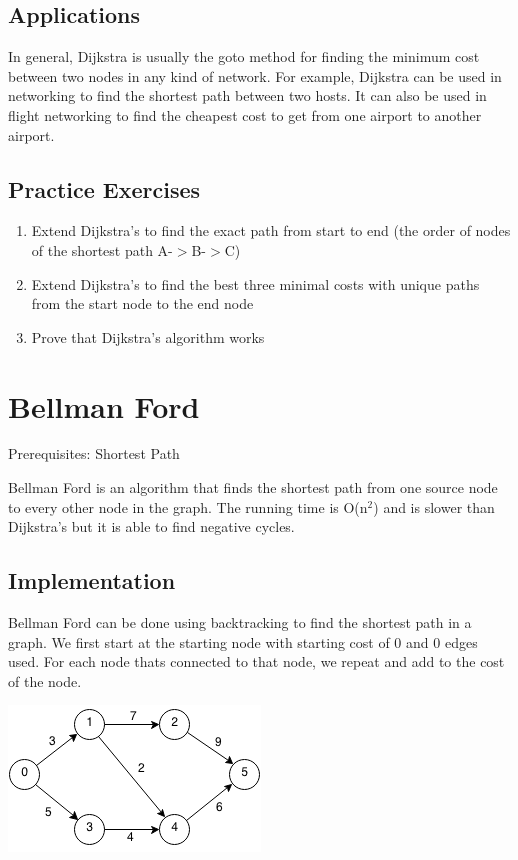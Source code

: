 \documentclass[11pt,oneside]{book}
\makeatletter
\def\maxwidth#1{\ifdim\Gin@nat@width>#1 #1\else\Gin@nat@width\fi}
\makeatother
\begin{document}
\subsection{Applications}

In general, Dijkstra is usually the goto method for finding the minimum cost between two nodes in any kind of network. For example, Dijkstra can be used in networking to find the shortest path between two hosts. It can also be used in flight networking to find the cheapest cost to get from one airport to another airport.

\subsection{Practice Exercises}

\begin{enumerate}
\item Extend Dijkstra's to find the exact path from start to end (the order of nodes of the shortest path A-$>$B-$>$C)
\item Extend Dijkstra's to find the best three minimal costs with unique paths from the start node to the end node
\item Prove that Dijkstra's algorithm works
\end{enumerate}

        \section{ Bellman Ford }
        

Prerequisites:  Shortest Path

Bellman Ford is an algorithm that finds the shortest path from one source node to every other node in the graph. The running time is O(n$^{2}$) and is slower than Dijkstra's but it is able to find negative cycles.

\subsection{Implementation}

Bellman Ford can be done using backtracking to find the shortest path in a graph. We first start at the starting node with starting cost of 0 and 0 edges used. For each node thats connected to that node, we repeat and add to the cost of the node.

\vspace{5px}\includegraphics[width=\maxwidth{\textwidth}]{bellmanford.png}
\end{document}
